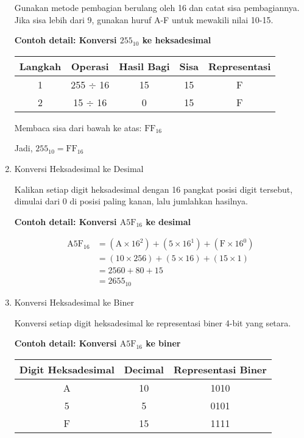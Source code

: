 \documentclass[../main.tex]{subfiles}
\begin{document}
\begin{enumerate}
Gunakan metode pembagian berulang oleh 16 dan catat sisa pembagiannya. Jika sisa lebih dari 9, gunakan huruf A-F untuk mewakili nilai 10-15.

\textbf{Contoh detail: Konversi \(255_{10}\) ke heksadesimal}

\begin{center}
\begin{tabular}{|c|c|c|c|c|}
\hline
\textbf{Langkah} & \textbf{Operasi} & \textbf{Hasil Bagi} & \textbf{Sisa} & \textbf{Representasi} \\
\hline
1 & 255 $\div$ 16 & 15 & 15 & F \\
2 & 15 $\div$ 16 & 0 & 15 & F \\
\hline
\end{tabular}
\end{center}

Membaca sisa dari bawah ke atas: \(\mathrm{FF}_{16}\)

Jadi, \(255_{10} = \mathrm{FF}_{16}\)

\item{Konversi Heksadesimal ke Desimal}

Kalikan setiap digit heksadesimal dengan 16 pangkat posisi digit tersebut, dimulai dari 0 di posisi paling kanan, lalu jumlahkan hasilnya.

\textbf{Contoh detail: Konversi \(\mathrm{A5F}_{16}\) ke desimal}

\begin{align*}
\mathrm{A5F}_{16} &= (\mathrm{A} \times 16^2) + (5 \times 16^1) + (\mathrm{F} \times 16^0) \\
&= (10 \times 256) + (5 \times 16) + (15 \times 1) \\
&= 2560 + 80 + 15 \\
&= 2655_{10}
\end{align*}

\item{Konversi Heksadesimal ke Biner}

Konversi setiap digit heksadesimal ke representasi biner 4-bit yang setara.

\textbf{Contoh detail: Konversi \(\mathrm{A5F}_{16}\) ke biner}

\begin{center}
\begin{tabular}{|c|c|c|}
\hline
\textbf{Digit Heksadesimal} & \textbf{Decimal} & \textbf{Representasi Biner} \\
\hline
A & 10 & 1010 \\
5 & 5 & 0101 \\
F & 15 & 1111 \\
\hline
\end{tabular}
\end{center}


\end{enumerate}
\end{document}

